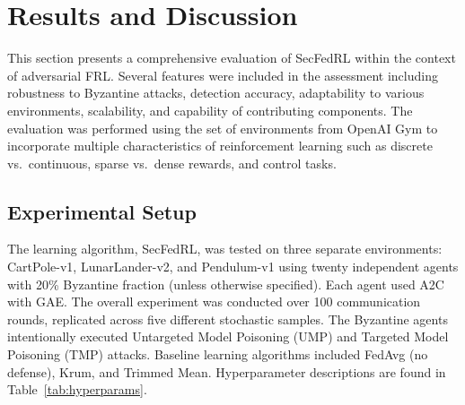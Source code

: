 \documentclass[12pt,a4paper]{article}
\begin{document}
\section{Results and Discussion}
\label{sec:results}

This section presents a comprehensive evaluation of SecFedRL within the
context of adversarial FRL. Several features were included in the assessment including
robustness to Byzantine attacks, detection accuracy, adaptability to various
environments, scalability, and capability of contributing components. The evaluation
was performed using the set of environments from OpenAI Gym to incorporate multiple
characteristics of reinforcement learning such as discrete vs.\ continuous, sparse
vs.\ dense rewards, and control tasks.

\subsection{Experimental Setup}

The learning algorithm, SecFedRL, was tested on three separate environments:
CartPole-v1, LunarLander-v2, and Pendulum-v1 using twenty independent agents with
20\% Byzantine fraction (unless otherwise specified). Each agent used A2C with GAE.
The overall experiment was conducted over 100 communication rounds, replicated across
five different stochastic samples. The Byzantine agents intentionally executed
Untargeted Model Poisoning (UMP) and Targeted Model Poisoning (TMP) attacks. Baseline
learning algorithms included FedAvg (no defense), Krum, and Trimmed Mean. Hyperparameter
descriptions are found in Table~\ref{tab:hyperparams}.
\end{document}
